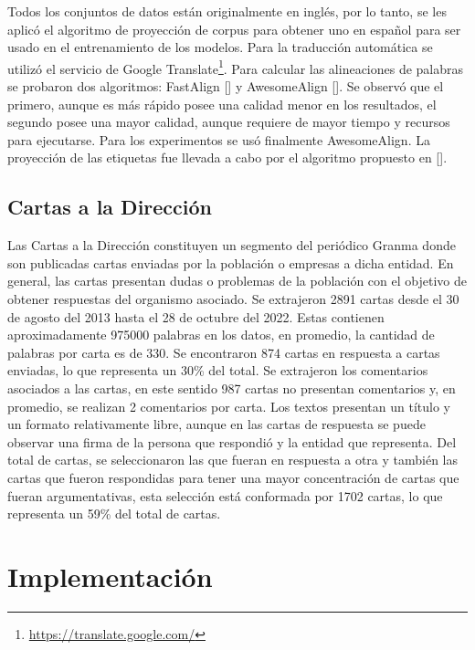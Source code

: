 Todos los conjuntos de datos están originalmente en inglés, por lo tanto, se les aplicó el algoritmo de proyección
de corpus para obtener uno en español para ser usado en el entrenamiento de los modelos. 
Para la traducción automática se utilizó el servicio de Google Translate\footnote{\href{https://translate.google.com/}{https://translate.google.com/}}. 
Para calcular las 
alineaciones de palabras se probaron dos algoritmos: FastAlign [\cite{dyer2013fastalign}] y AwesomeAlign 
[\cite{dou2021word}]. Se observó que el primero, aunque es más rápido posee una calidad menor en los resultados,
el segundo posee una mayor calidad, aunque requiere de mayor tiempo y recursos para ejecutarse. Para los experimentos
se usó finalmente AwesomeAlign. La proyección de las etiquetas fue llevada a cabo por el algoritmo propuesto 
en [\cite{eger2018cross}].

\subsection{Cartas a la Dirección}

Las Cartas a la Dirección constituyen un segmento del periódico Granma donde son publicadas
cartas enviadas por la población o empresas a dicha entidad. En general, las cartas 
presentan dudas o problemas de la población con el objetivo de obtener respuestas del organismo
asociado. Se extrajeron 2891 cartas desde el 30 de agosto del 2013 hasta el 28 de octubre del 2022. Estas 
contienen aproximadamente 975000 palabras en los datos, en promedio, la cantidad de palabras por carta es de 330.
Se encontraron 874 cartas en respuesta a cartas enviadas, lo que representa un 30\% del total. Se extrajeron
los comentarios asociados a las cartas, en este sentido 987 cartas no presentan comentarios y, en promedio, 
se realizan 2 comentarios por carta. Los textos presentan un título y un formato relativamente libre, 
aunque en las cartas de respuesta se puede observar una firma de la persona que respondió y la entidad que 
representa. Del total de cartas, se seleccionaron las que fueran en respuesta a otra y también las 
cartas que fueron respondidas para tener una mayor concentración de cartas que fueran argumentativas, 
esta selección está conformada por 1702 cartas, lo que representa un 59\% del total de cartas.

\section{Implementación}

